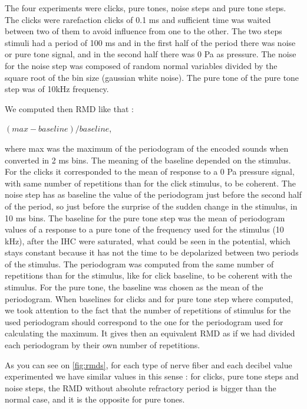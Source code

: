 The four experiments were clicks, pure tones, noise steps and pure tone steps.
The clicks were rarefaction clicks of 0.1 ms and sufficient time was waited between 
two of them to avoid influence from one to the other.
The two steps stimuli had a period of 100 ms and in the first half of the period 
there was noise or pure tone signal, and in the second half there was 0 Pa as pressure.
The noise for the noise step was composed of random normal variables divided 
by the square root of the bin size (gaussian white noise).
The pure tone of the pure tone step was of 10kHz frequency.

We computed then RMD like that : 

$(max - baseline) / baseline$,

where max was 
the maximum of the periodogram of the encoded sounds when converted in 2 ms bins.
The meaning of the baseline depended on the stimulus. 
For the clicks it corresponded to the mean of response to a 0 Pa pressure signal,
 with same number of repetitions than for the click stimulus, to be coherent. 
The noise step has as baseline the value of the periodogram just before the second 
half of the period, so just before the surprise of the sudden change in the stimulus,
 in 10 ms bins. 
The baseline for the pure tone step was the mean of periodogram values
of a response to a pure tone of the frequency used for the stimulus (10 kHz),
after the IHC were saturated, what could be seen in the potential, 
which stays constant because it has not the time 
to be depolarized between two periods of the stimulus. 
The periodogram was computed from the same number of repetitions than for the stimulus, 
like for click baseline, to be coherent with the stimulus.
For the pure tone, the baseline was chosen as the mean of the periodogram.
When baselines for clicks and for pure tone step where computed, 
we took attention to the fact that the number of repetitions of stimulus
for the used periodogram should correspond to the one for the periodogram used for 
calculating the maximum. 
It gives then an equivalent RMD as if we had divided each periodogram by 
their own number of repetitions.

As you can see on \autoref{fig:rmds}, for each type of nerve fiber and 
each decibel value experimented we have similar values in this sense :
for clicks, pure tone steps and noise steps, the RMD without absolute refractory
period is bigger than the normal case, and it is the opposite for pure tones.





